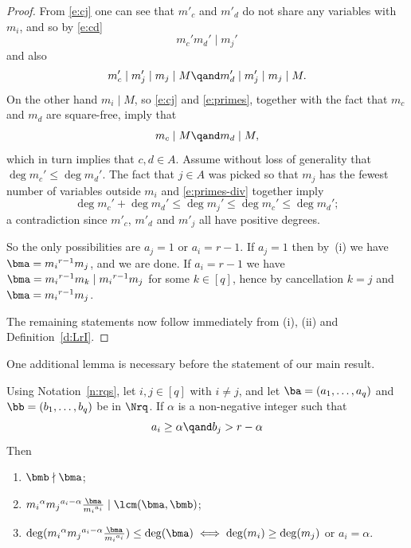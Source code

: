 \begin{proof}
From \eqref{e:cj} one can see that $m'_c$ and $m'_d$ do not share any variables with $m_i$, and so by \eqref{e:cd}
\begin{equation}\label{e:primes-div}
  m_c'm_d' \mid m_j' 
\end{equation} and also
\begin{equation}\label{e:primes}
  m_c' \mid m_j' \mid m_j \mid M \qand
  m_d' \mid m_j' \mid m_j \mid M.
\end{equation}
On the other hand $m_i \mid M$, so \eqref{e:cj} and \eqref{e:primes},
together with the fact that $m_c$ and $m_d$ are square-free, imply
that $$m_c \mid M \qand m_d \mid M,$$ which in turn implies that $c,d
\in A$. Assume without loss of generality that $\deg m_c' \leq \deg
m_d'$. The fact that $j \in A$ was picked so that $m_j$ has the fewest
number of variables outside $m_i$ and \eqref{e:primes-div} together
imply
$$  \deg m_c'+\deg m_d ' \leq
\deg m_j' \leq \deg m_c' \leq \deg m_d'; $$
a contradiction since $m'_c$, $m'_d$ and $m'_j$ all have positive degrees.


So the only possibilities are $a_j=1$ or $a_i=r-1$.  If $a_j=1$
then by~\textup{(}i\textup{)} we have $\bma ={m_i}^{r-1}m_j$, and we are done.  If
$a_i=r-1$ we have $\bma ={m_i}^{r-1}m_k \mid {m_i}^{r-1}m_j$ for some
$k \in [q]$, hence by cancellation $k=j$ and 
$\bma={m_i}^{r-1}{m_j}$.

The remaining statements now follow immediately from \textup{(}i\textup{)}, \textup{(}ii\textup{)} and
Definition~\ref{d:LrI}.
\end{proof}



One additional lemma is necessary before the
statement of our main result.

\begin{lemm}\label{l:non-div}
Using Notation~\ref{n:rqs}, let $i,j \in [q]$ with $i
\not = j$, and let $\ba=(a_1, \ldots, a_q)$ and $\bb=(b_1, \ldots,
b_q)$ be in $\Nrq$. If $\alpha$ is a non-negative integer such that
$$a_i \ge \alpha\qand b_j> r-\alpha
$$
Then
\begin{enumerate}[label=\textup{(}\roman*\textup{)}]
\item $\bmb \nmid \bma$;

\item ${m_i}^{\alpha}{m_j}^{a_i-\alpha}\frac{\bma}{{m_i}^{a_i}}\mid \lcm(\bma, \bmb)$;

\item $\deg({m_i}^{\alpha}{m_j}^{a_i-\alpha}\frac{\bma}{{m_i}^{a_i}}) \leq
  \deg(\bma) \iff \deg(m_i) \geq \deg (m_j)$ or $a_i=\alpha$.

\end{enumerate}
\end{lemm}


